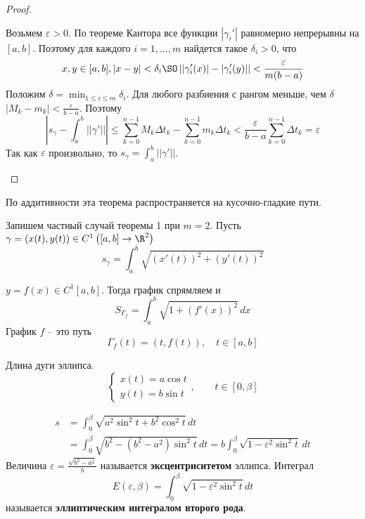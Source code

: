\begin{proof}
\begin{MyList}
		Возьмем $\varepsilon > 0$. По теореме Кантора все функции $|\gamma_i'|$ равномерно непрерывны на $[a, b]$. Поэтому для каждого $i = 1, ..., m$ найдется такое $\delta_i > 0$, что
		\[x, y \in [a, b], |x - y| < \delta_i \SO \left||\gamma_i'(x)| - |\gamma_i'(y)|\right| < \frac{\varepsilon}{m(b - a)}\]
		Положим $\delta = \displaystyle \min_{1 \leqslant i \leqslant m} \delta_i$.
		Для любого разбиения с рангом меньше, чем $\delta$ $|M_k - m_k| < \frac{\varepsilon}{b - a}$. Поэтому
		\[\left|s_\gamma - \int_a^b ||\gamma'||\right| \leqslant \sum_{k=0}^{n - 1} M_k \Delta t_k - \sum_{k=0}^{n - 1} m_k \Delta t_k < \frac{\varepsilon}{b - a} \sum_{k=0}^{n - 1} \Delta t_k = \varepsilon\]
		Так как $\varepsilon$ произвольно, то $s_\gamma = \int_a^b ||\gamma'||$.
	\end{MyList}
\end{proof}

\begin{Rem}
	По аддитивности эта теорема распространяется на кусочно-гладкие пути.
\end{Rem}

\begin{Rem}
	Запишем частный случай теоремы 1 при $m = 2$.
	Пусть $\gamma = (x(t), y(t)) \in C^{1} \left([a, b] \to \R^2\right)$  
	\[s_\gamma = \int_a^b \sqrt{(x'(t))^2 + (y'(t))^2}\]
\end{Rem}

\begin{Cons}
	$y = f(x) \in C^1[a, b]$. Тогда график спрямляем и
	\[S_{\Gamma_f} = \int_a^b \sqrt{1 + (f'(x))^2} \,dx\]
	График $f$ -- это путь
	\[\Gamma_f (t) = (t, f(t)), \quad t \in [a, b]\]	 
\end{Cons}

\begin{Example}
	Длина дуги эллипса.
	\[\begin{cases}
		x(t) = a \cos t \\
		y(t) = b \sin t
	\end{cases}, \qquad t \in [0, \beta]\]

	\begin{figure}[H]
		\centering
		\def\svgwidth{.25\columnwidth}
		
	\end{figure}
	\begin{align*}
		s &= \int_0^\beta \sqrt{a^2 \sin^2 t + b^2 \cos^2 t}\,dt \\
		&= \int_0^\beta \sqrt{b^2 - (b^2 - a^2) \sin^2 t}\,dt = b \int_0^\beta \sqrt{1 - \varepsilon^2 \sin^2 t}\,dt
	\end{align*}
	Величина $\varepsilon = \frac{\sqrt{b^2 - a^2}}{b}$ называется \textbf{эксцентриситетом} эллипса.
	Интеграл
	\[E(\varepsilon, \beta) = \int_0^\beta \sqrt{1 - \varepsilon^2 \sin^2 t} \,dt\] 
	называется \textbf{эллиптическим интегралом второго рода}. 
\end{Example}

